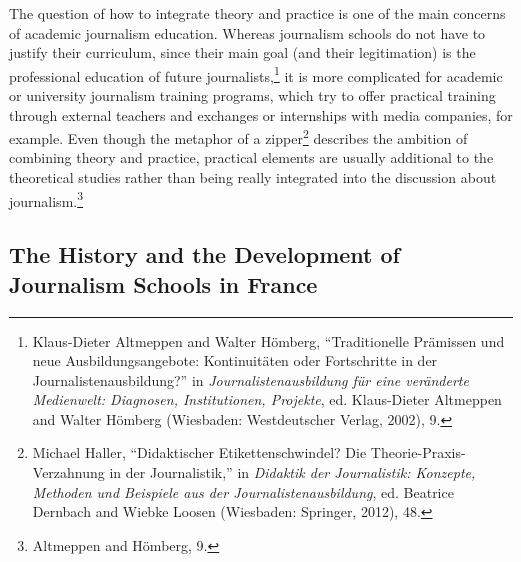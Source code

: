 \documentclass{tufte-handout}
\begin{document}
The question of how to integrate theory and practice is one of the main
concerns of academic journalism education. Whereas journalism schools do
not have to justify their curriculum, since their main goal (and their
legitimation) is the professional education of future
journalists,\footnote{Klaus-Dieter Altmeppen and Walter Hömberg,
  ``Traditionelle Prämissen und neue Ausbildungsangebote: Kontinuitäten
  oder Fortschritte in der Journalistenausbildung?'' in
  \emph{Journalistenausbildung für eine veränderte Medienwelt:
  Diagnosen, Institutionen, Projekte}, ed. Klaus-Dieter Altmeppen and
  Walter Hömberg (Wiesbaden: Westdeutscher Verlag, 2002), 9.} it is more
complicated for academic or university journalism training programs,
which try to offer practical training through external teachers and
exchanges or internships with media companies, for example. Even though
the metaphor of a zipper\footnote{Michael Haller, ``Didaktischer
  Etikettenschwindel? Die Theorie-Praxis-Verzahnung in der
  Journalistik,'' in \emph{Didaktik der Journalistik: Konzepte, Methoden
  und Beispiele aus der Journalistenausbildung}, ed. Beatrice Dernbach
  and Wiebke Loosen (Wiesbaden: Springer, 2012), 48.} describes the
ambition of combining theory and practice, practical elements are
usually additional to the theoretical studies rather than being really
integrated into the discussion about journalism.\footnote{Altmeppen and
  Hömberg, 9.}

\hypertarget{the-history-and-the-development-of-journalism-schools-in-france}{%
\subsection{The History and the Development of
Journalism Schools in
France}\label{the-history-and-the-development-of-journalism-schools-in-france}}
\end{document}
